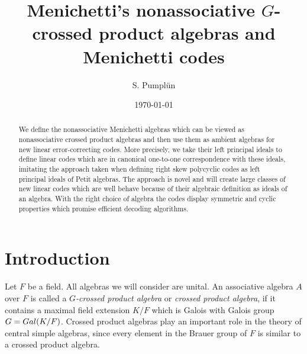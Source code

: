 \documentclass[11pt]{amsart}
\theoremstyle{plain}
\theoremstyle{definition}
\begin{document}
\setlength{\parindent}{0pt}



\author{S. Pumpl\"un}


\address{School of Mathematical Sciences\\
University of Nottingham\\ University Park\\ Nottingham NG7 2RD\\
United Kingdom }

\date{\today}






\title[Menichetti's nonassociative $G$-crossed product algebras]
{Menichetti's nonassociative $G$-crossed product algebras  and Menichetti codes}


\maketitle


\begin{abstract}
We define the nonassociative Menichetti algebras which can be viewed as nonassociative crossed product algebras  and then use them as ambient algebras for new linear error-correcting codes. More precisely, we take their left principal ideals to define linear codes which are in canonical one-to-one correspondence with these ideals, imitating the approach taken when defining right skew polycyclic codes as left principal ideals of Petit algebras.
The approach is novel and will create large classes of new linear codes which are well behave because of their algebraic definition as ideals of an algebra. 
 With the right choice of algebra the codes display symmetric and cyclic properties which promise efficient decoding algorithms.
  \end{abstract}



\section{Introduction}



Let $F$ be a field. All algebras we will consider are unital. An associative algebra $A$ over $F$ is called a \emph{$G$-crossed product algebra} or
\emph{crossed product algebra}, if it contains a maximal field extension $K/F$ which is Galois
with Galois group $G = {\rm Gal}(K/F)$. Crossed product algebras play an important role in
the theory of central simple algebras, since every element in the Brauer
group of $F$ is similar to a crossed product algebra.
\end{document}
